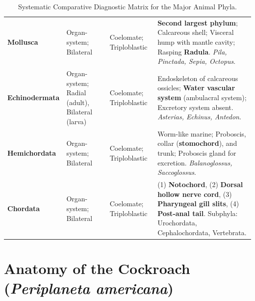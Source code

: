 \documentclass[10pt,twoside,openright]{book}
\begin{document}
\begin{table}[htbp]
\begin{tabularx}{\textwidth}{l >{\RaggedRight}p{1.9cm} >{\RaggedRight}p{2.6cm} >{\RaggedRight}X}
\textbf{Mollusca} & Organ-system; Bilateral & Coelomate; Triploblastic & \textbf{Second largest phylum}; Calcareous shell; Visceral hump with mantle cavity; Rasping \textbf{Radula}. \textit{Pila, Pinctada, Sepia, Octopus}. \\
\textbf{Echinodermata} & Organ-system; Radial (adult), Bilateral (larva) & Coelomate; Triploblastic & Endoskeleton of calcareous ossicles; \textbf{Water vascular system} (ambulacral system); Excretory system absent. \textit{Asterias, Echinus, Antedon}. \\
\textbf{Hemichordata} & Organ-system; Bilateral & Coelomate; Triploblastic & Worm-like marine; Proboscis, collar (\textbf{stomochord}), and trunk; Proboscis gland for excretion. \textit{Balanoglossus, Saccoglossus}. \\
\textbf{Chordata} & Organ-system; Bilateral & Coelomate; Triploblastic & (1) \textbf{Notochord}, (2) \textbf{Dorsal hollow nerve cord}, (3) \textbf{Pharyngeal gill slits}, (4) \textbf{Post-anal tail}. Subphyla: Urochordata, Cephalochordata, Vertebrata. \\
\bottomrule
\end{tabularx}
\caption{Systematic Comparative Diagnostic Matrix for the Major Animal Phyla.}
\label{tab:animal_phyla_diagnostic}
\end{table}

\section{Anatomy of the Cockroach (\textit{Periplaneta americana})}
\end{document}
